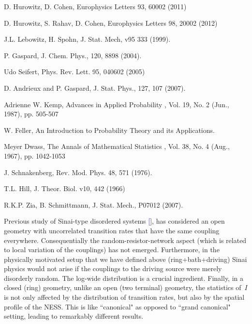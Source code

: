 \documentclass[aps,prl,floats,floatfix,twocolumn]{revtex4}
\renewcommand{\cite}[1]{\textcolor{blue}{[\onlinecite{#1}}]} %
\begin{document}
\begin{thebibliography}{99}
D. Hurowitz, D. Cohen,
Europhysics Letters 93, 60002 (2011) 


D. Hurowitz, S. Rahav, D. Cohen,
Europhysics Letters 98, 20002 (2012) 



J.L. Lebowitz, H. Spohn, J. Stat. Mech, v95 333 (1999).

P. Gaspard, J. Chem. Phys., 120, 8898 (2004).

Udo Seifert, 
Phys. Rev. Lett. 95, 040602 (2005)

D. Andrieux and P. Gaspard, J. Stat. Phys., 127, 107 (2007).



Adrienne W. Kemp,
Advances in Applied Probability , Vol. 19, No. 2 (Jun., 1987), pp. 505-507

W. Feller, 
An Introduction to Probability Theory and its Applications.

Meyer Dwass,
The Annals of Mathematical Statistics , Vol. 38, No. 4 (Aug., 1967), pp. 1042-1053



J. Schnakenberg,
Rev. Mod. Phys. 48, 571 (1976).

T.L. Hill, 
J. Theor. Biol. v10, 442 (1966)

R.K.P. Zia, B. Schmittmann, 
J. Stat. Mech., P07012 (2007).





%
Previous study of Sinai-type disordered systems \cite{sinai2}, 
has considered an open geometry with uncorrelated transition rates 
that have the same coupling everywhere. Consequentially 
the random-resistor-network aspect (which is related to local 
variation of the couplings) has not emerged.
%
Furthermore, in the physically motivated setup that we have 
defined above (ring+bath+driving) Sinai physics would not arise 
if the couplings to the driving source were merely disorderly random. 
The log-wide distribution is a crucial ingredient. 
%
Finally, in a closed (ring) geometry, unlike an open (two terminal) geometry, 
the statistics of~$I$ is not only affected by the distribution of transition rates, 
but also by the spatial profile of the NESS. 
This is like ``canonical" as opposed to ``grand canonical" setting, 
leading to remarkably different results.
 


\end{thebibliography}
\end{document}
